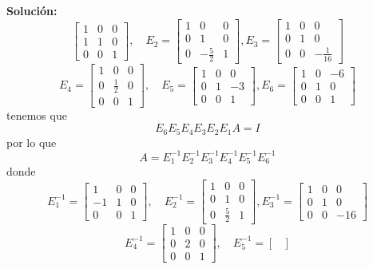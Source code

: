\documentclass[12pt]{article}
\newenvironment{solucion}
{\begin{mdframed}[backgroundcolor=black!10]
		{\bf Solución:}\\
	}
	{
	\end{mdframed}
}
\newenvironment{preguntas}
{\begin{enumerate}\itemsep12pt
	}
	{
	\end{enumerate}
}
\begin{document}
\begin{preguntas}
\begin{solucion}
$$\begin{bmatrix}
		1 & 0 & 0\\
		1 & 1 & 0\\
		0 & 0 & 1
		\end{bmatrix}, \quad E_2 = \begin{bmatrix}
		1 & 0 & 0\\
		0 & 1 & 0\\
		0 & -\frac{5}{2} & 1
		\end{bmatrix}, E_3 = \begin{bmatrix}
		1 & 0 & 0\\
		0 & 1 & 0\\
		0 & 0 & -\frac{1}{16}
		\end{bmatrix}$$
		$$E_4 = \begin{bmatrix}
		1 & 0 & 0\\
		0 & \frac{1}{2} & 0\\
		0 & 0 & 1
		\end{bmatrix}, \quad E_5 = \begin{bmatrix}
		1 & 0 & 0\\
		0 & 1 & -3\\
		0 & 0 & 1
		\end{bmatrix}, E_6 = \begin{bmatrix}
		1 & 0 & -6\\
		0 & 1 & 0\\
		0 & 0 & 1
		\end{bmatrix}$$
		tenemos que
		$$E_6E_5E_4E_3E_2E_1A = I$$
		por lo que
		$$A = E_1^{-1}E_2^{-1}E_3^{-1}E_4^{-1}E_5^{-1}E_6^{-1}$$
		donde
		$$E_1^{-1} = \begin{bmatrix}
		1 & 0 & 0\\
		-1 & 1 & 0\\
		0 & 0 & 1
		\end{bmatrix}, \quad E_2^{-1} = \begin{bmatrix}
		1 & 0 & 0\\
		0 & 1 & 0\\
		0 & \frac{5}{2} & 1
		\end{bmatrix}, E_3^{-1} = \begin{bmatrix}
		1 & 0 & 0\\
		0 & 1 & 0\\
		0 & 0 & -16
		\end{bmatrix}$$
		$$E_4^{-1} = \begin{bmatrix}
		1 & 0 & 0\\
		0 & 2 & 0\\
		0 & 0 & 1
		\end{bmatrix}, \quad E_5^{-1} = \begin{bmatrix}

\end{bmatrix}$$
\end{solucion}
\end{preguntas}
\end{document}
